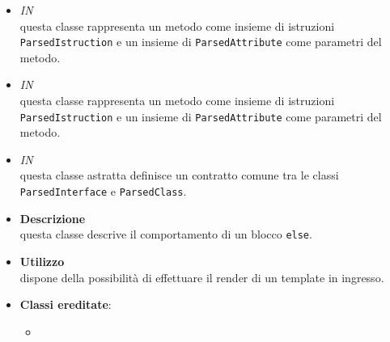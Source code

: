 \begin{itemize}
\begin{itemize}
\item \textit{IN} \hyperref[\nogloxy{swedesigner::server::project::ParsedMethod}]{}\\
questa classe rappresenta un metodo come insieme di istruzioni \texttt{ParsedIstruction} e un insieme di \texttt{ParsedAttribute} come parametri del metodo.
\item \textit{IN} \hyperref[\nogloxy{swedesigner::server::project::ParsedMethod}]{}\\
questa classe rappresenta un metodo come insieme di istruzioni \texttt{ParsedIstruction} e un insieme di \texttt{ParsedAttribute} come parametri del metodo.
\item \textit{IN} \hyperref[\nogloxy{swedesigner::server::project::ParsedType}]{}\\
questa classe astratta definisce un contratto comune tra le classi \texttt{ParsedInterface} e \texttt{ParsedClass}. 
\end{itemize}
\end{itemize}

\label{\nogloxy{swedesigner::server::project::ParsedElse}}
\begin{itemize}
\item \textbf{Descrizione}\\
questa classe descrive il comportamento di un blocco \texttt{else}.
\item \textbf{Utilizzo}\\
dispone della possibilità di effettuare il render di un template in ingresso.
\item \textbf{Classi ereditate}:
\begin{itemize}
\item \hyperref[\nogloxy{swedesigner::server::project::ParsedInstruction}]{}
\end{itemize}
\end{itemize}

